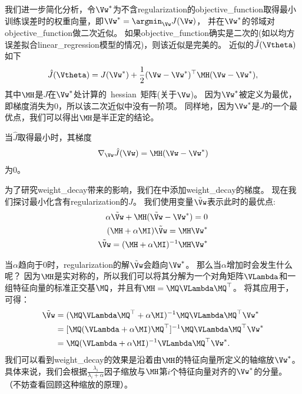 我们进一步简化分析，令$\Vw^*$为不含\gls{regularization}的\gls{objective_function}取得最小训练误差时的权重向量，即$\Vw^* = \argmin_{\Vw} J(\Vw)$， 并在$\Vw^*$的邻域对\gls{objective_function}做二次近似。  
如果\gls{objective_function}确实是二次的(如以均方误差拟合\gls{linear_regression}模型的情况)，则该近似是完美的。
近似的$\hat J(\Vtheta)$如下
\begin{align}
 \hat J(\Vtheta) = J(\Vw^*) + \frac{1}{2}(\Vw - \Vw^*)^\top \MH (\Vw - \Vw^*),
\end{align}
其中$\MH$是$J$在$\Vw^*$处计算的~\gls{hessian}~矩阵(关于$\Vw$)。
因为$\Vw^*$被定义为最优，即梯度消失为$0$，所以该二次近似中没有一阶项。
同样地，因为$\Vw^*$是$J$的一个最优点，我们可以得出$\MH$是半正定的结论。

当$\hat J$取得最小时，其梯度
\begin{align}
\label{eq:gradient}
  \nabla_{\Vw} \hat{J}(\Vw) = \MH (\Vw - \Vw^*)
\end{align}
为$0$。

为了研究\gls{weight_decay}带来的影响，我们在中添加\gls{weight_decay}的梯度。 
现在我们探讨最小化含有\gls{regularization}的$\hat J$。
我们使用变量$\tilde{\Vw}$表示此时的最优点:
\begin{align}
 \alpha \tilde{\Vw} + \MH (\tilde{\Vw} - \Vw^*) = 0 \\
 (\MH + \alpha \MI) \tilde{\Vw} = \MH \Vw^* \\
 \tilde{\Vw} = (\MH + \alpha \MI)^{-1} \MH \Vw^* \label{eq:final_w}
 \end{align}

当$\alpha$趋向于$0$时，\gls{regularization}的解$\tilde{\Vw}$会趋向$\Vw^*$。 
那么当$\alpha$增加时会发生什么呢？
因为$\MH$是实对称的，所以我们可以将其分解为一个对角矩阵$\VLambda$和一组特征向量的标准正交基$\MQ$，并且有$\MH = \MQ \VLambda \MQ^\top$。
将其应用于，可得：
\begin{align}
 \tilde \Vw &= ( \MQ \VLambda \MQ^\top + \alpha \MI)^{-1} \MQ \VLambda \MQ^\top \Vw^* \\
                 &=  [ \MQ( \VLambda+ \alpha \MI)  \MQ^\top ]^{-1} \MQ \VLambda \MQ^\top \Vw^* \\
                 &= \MQ( \VLambda+ \alpha \MI)^{-1} \VLambda \MQ^\top \Vw^*. \label{eq:713L2}
\end{align}
我们可以看到\gls{weight_decay}的效果是沿着由$\MH$的特征向量所定义的轴缩放$\Vw^*$。
具体来说，我们会根据$\frac{\lambda_i}{\lambda_i + \alpha}$因子缩放与$\MH$第$i$个特征向量对齐的$\Vw^*$的分量。
（不妨查看回顾这种缩放的原理）。


